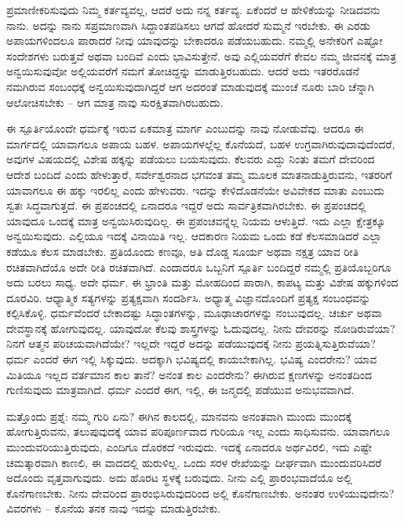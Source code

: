 ಪ್ರಮಾಣೀಕರಿಸುವುದು ನಿಮ್ಮ ಕರ್ತವ್ಯವಲ್ಲ, ಆದರೆ ಅದು ನನ್ನ ಕರ್ತವ್ಯ. ಏಕೆಂದರೆ ಆ ಹೇಳಿಕೆಯನ್ನು ನೀಡಿದವನು ನಾನು. ಅದನ್ನು ನಾನು ಸಪ್ರಮಾಣವಾಗಿ ಸಿದ್ದಾಂತಪಡಿಸಲು ಆಗದೆ ಹೋದರೆ ಸುಮ್ಮನೆ ಇರಬೇಕು. ಈ ಎರಡು ಅಪಾಯಗಳಿಂದಲೂ ಪಾರಾದರೆ ನೀವು ಯಾವುದನ್ನು ಬೇಕಾದರೂ ಪಡೆಯಬಹುದು. ನಮ್ಮಲ್ಲಿ ಅನೇಕರಿಗೆ ಎಷ್ಟೋ ಸಂದೇಶಗಳು ಬರುತ್ತವೆ ಅಥವಾ ಬಂದಿವೆ ಎಂದು ಭಾವಿಸುತ್ತೇನೆ. ಅವು ಎಲ್ಲಿಯವರೆಗೆ ಕೇವಲ ನಮ್ಮ ಜೀವನಕ್ಕೆ ಮಾತ್ರ ಅನ್ವಯಿಸುವುವೋ ಅಲ್ಲಿಯವರೆಗೆ ನಮಗೆ ತೋಚಿದ್ದನ್ನು ಮಾಡುತ್ತಿರಬಹುದು. ಆದರೆ ಅದು ಇತರರೊಡನೆ ನಮಗಿರುವ ಸಂಬಂಧಕ್ಕೆ ಅನ್ವಯಿಸುವುದಾಗಿದ್ದರೆ ಆಗ ಅದರಂತೆ ಮಾಡುವುದಕ್ಕೆ ಮುಂಚೆ ನೂರು ಬಾರಿ ಚೆನ್ನಾಗಿ ಆಲೋಚಿಸಬೇಕು – ಆಗ ಮಾತ್ರ ನಾವು ಸುರಕ್ಷಿತವಾಗಿರಬಹುದು.

\newpage

ಈ ಸ್ಪೂರ್ತಿಯೊಂದೇ ಧರ್ಮಕ್ಕೆ ಇರುವ ಏಕಮಾತ್ರ ಮಾರ್ಗ ಎಂಬುದನ್ನು ನಾವು ನೋಡುವೆವು. ಆದರೂ ಈ ಮಾರ್ಗದಲ್ಲಿ ಯಾವಾಗಲೂ ಅಪಾಯ ಬಹಳ. ಅಪಾಯಗಳಲ್ಲೆಲ್ಲ ಕೊನೆಯದೆ, ಬಹಳ ಉಗ್ರವಾಗಿರುವುದಾವುದೆಂದರೆ, ಅವುಗಳ ವಿಷಯದಲ್ಲಿ ವಿಶೇಷ ಹಕ್ಕನ್ನು ಪಡೆಯಲು ಬಯಸುವುದು. ಕೆಲವರು ಎದ್ದು ನಿಂತು ತಮಗೆ ದೇವರಿಂದ ಆದೇಶ ಬಂದಿದೆ ಎಂದು ಹೇಳುತ್ತಾರೆ, ಸರ್ವೇಶ್ವರನಾದ ಭಗವಂತ ತಮ್ಮ ಮೂಲಕ ಮಾತನಾಡುತ್ತಿರುವನು, ಇತರರಿಗೆ ಯಾವಾಗಲೂ ಈ ಹಕ್ಕು ಇರಲಿಲ್ಲ ಎಂದು ಹೇಳುವರು. ಇದನ್ನು ಕೇಳಿದೊಡನೆಯೇ ಅವಿವೇಕದ ಮಾತು ಎಂಬುದು ಸ್ವತಃ ಸಿದ್ಧವಾಗುತ್ತದೆ. ಈ ಪ್ರಪಂಚದಲ್ಲಿ ಏನಾದರೂ ಇದ್ದರೆ ಅದು ಸಾರ್ವತ್ರಿಕವಾಗಿರಬೇಕು. ಈ ಪ್ರಪಂಚದಲ್ಲಿ ಯಾವುದೂ ಒಂದಕ್ಕೆ ಮಾತ್ರ ಅನ್ವಯಿಸಿರುವುದಿಲ್ಲ. ಈ ಪ್ರಪಂಚವನ್ನೆಲ್ಲ ನಿಯಮ ಆಳುತ್ತಿದೆ. ಇದು ಎಲ್ಲಾ ಕ್ಷೇತ್ರಕ್ಕೂ ಅನ್ವಯಿಸುವುದು. ಎಲ್ಲಿಯೂ ಇದಕ್ಕೆ ವಿನಾಯಿತಿ ಇಲ್ಲ. ಆದಕಾರಣ ನಿಯಮ ಒಂದು ಕಡೆ ಕೆಲಸಮಾಡಿದರೆ ಎಲ್ಲಾ ಕಡೆಯೂ ಕೆಲಸ ಮಾಡಬೇಕು. ಪ್ರತಿಯೊಂದು ಕಣವೂ, ಅತಿ ದೊಡ್ಡ ಸೂರ್ಯ ಅಥವಾ ನಕ್ಷತ್ರ ಯಾವ ರೀತಿ ರಚಿತವಾಗಿದೆಯೊ ಅದೇ ರೀತಿ ರಚಿತವಾಗಿದೆ. ಎಂದಾದರೂ ಒಬ್ಬನಿಗೆ ಸ್ಪೂರ್ತಿ ಬಂದಿದ್ದರೆ ನಮ್ಮಲ್ಲಿ ಪ್ರತಿಯೊಬ್ಬರಿಗೂ ಅದು ಬರಲು ಸಾಧ್ಯ. ಅದೇ ಧರ್ಮ. ಈ ಭ್ರಾಂತಿ ಮತ್ತು ಮೋಹದಿಂದ ಪಾರಾಗಿ, ಕಾಪಟ್ಯ ಮತ್ತು ವಿಶೇಷ ಹಕ್ಕುಗಳಿಂದ ದೂರವಿರಿ. ಆಧ್ಯಾತ್ಮಿಕ ಸತ್ಯಗಳನ್ನು ಪ್ರತ್ಯಕ್ಷವಾಗಿ ಸಂದರ್ಶಿಸಿ. ಅಧ್ಯಾತ್ಮ ವಿಜ್ಞಾನದೊಂದಿಗೆ ಪ್ರತ್ಯಕ್ಷ ಸಂಬಂಧವನ್ನು ಕಲ್ಪಿಸಿಕೊಳ್ಳಿ. ಧರ್ಮವೆಂದರೆ ಬೇಕಾದಷ್ಟು ಸಿದ್ಧಾಂತಗಳನ್ನು, ಮೂಢಾಚಾರಗಳನ್ನು ನಂಬುವುದಲ್ಲ. ಚರ್ಚು ಅಥವಾ ದೇವಸ್ಥಾನಕ್ಕೆ ಹೋಗುವುದಲ್ಲ. ಯಾವುದೋ ಕೆಲವು ಶಾಸ್ತ್ರಗಳನ್ನು ಓದುವುದಲ್ಲ. ನೀನು ದೇವರನ್ನು ನೋಡಿರುವೆಯಾ? ನಿನಗೆ ಆತ್ಮನ ಪರಿಚಯವಾಗಿದೆಯೇ? ಇಲ್ಲದೇ ಇದ್ದರೆ ಅದನ್ನು ಪಡೆಯುವುದಕ್ಕೆ ನೀನು ಪ್ರಯತ್ನಿಸುತ್ತಿರುವೆಯಾ? ಧರ್ಮ ಎಂದರೆ ಈಗ ಇಲ್ಲಿ ಸಿಕ್ಕುವುದು. ಅದಕ್ಕಾಗಿ ಭವಿಷ್ಯದಲ್ಲಿ ಕಾಯಬೇಕಾಗಿಲ್ಲ. ಭವಿಷ್ಯ ಎಂದರೇನು? ಯಾವ ಮಿತಿಯೂ ಇಲ್ಲದ ವರ್ತಮಾನ ಕಾಲ ತಾನೆ? ಅನಂತ ಕಾಲ ಎಂದರೇನು? ಈಗಿರುವ ಕ್ಷಣಗಳನ್ನು ಅನಂತದಿಂದ ಗುಣಿಸುವುದು ಮಾತ್ರವಾಗಿದೆ. ಧರ್ಮ ಎಂದರೆ ಈಗ, ಇಲ್ಲಿ, ಈ ಜನ್ಮದಲ್ಲಿ ಪಡೆಯುವ ಅನುಭವವಾಗಿದೆ.

ಮತ್ತೊಂದು ಪ್ರಶ್ನೆ: ನಮ್ಮ ಗುರಿ ಏನು? ಈಗಿನ ಕಾಲದಲ್ಲಿ, ಮಾನವನು ಅನಂತವಾಗಿ ಮುಂದು ಮುಂದಕ್ಕೆ ಹೋಗುತ್ತಿರುವನು, ತಲುಪುವುದಕ್ಕೆ ಯಾವ ಪರಿಪೂರ್ಣವಾದ ಗುರಿಯೂ ಇಲ್ಲ ಎಂದು ಸಾಧಿಸುವನು. ಯಾವಾಗಲೂ ಮುಂದುವರಿಯುತ್ತಿರುವುದು, ಎಂದಿಗೂ ದೊರಕದೆ ಇರುವುದು. ಇದಕ್ಕೆ ಏನಾದರೂ ಅರ್ಥವಿರಲಿ, ಇದು ಎಷ್ಟೇ ಚಮತ್ಕಾರವಾಗಿ ಕಾಣಲಿ, ಈ ವಾದದಲ್ಲಿ ಹುರುಳಿಲ್ಲ. ಒಂದು ಸರಳ ರೇಖೆಯನ್ನು ದೀರ್ಘವಾಗಿ ಮುಂದುವರಿಸಿದರೆ ಅದೊಂದು ವೃತ್ತವಾಗುವುದು. ಅದು ಹೊರಟ ಸ್ಥಳಕ್ಕೆ ಬರುವುದು. ನೀನು ಎಲ್ಲಿ ಪ್ರಾರಂಭವಾದೆಯೊ ಅಲ್ಲಿ ಕೊನೆಗಾಣಬೇಕು. ನೀನು ದೇವರಿಂದ ಪ್ರಾರಂಭಿಸಿರುವುದರಿಂದ ಅಲ್ಲಿ ಕೊನೆಗಾಣಬೇಕು. ಅನಂತರ ಉಳಿಯುವುದೇನು? ವಿವರಗಳು – ಕೊನೆಯ ತನಕ ನಾವು ಇದನ್ನು ಮಾಡುತ್ತಿರಬೇಕು.

